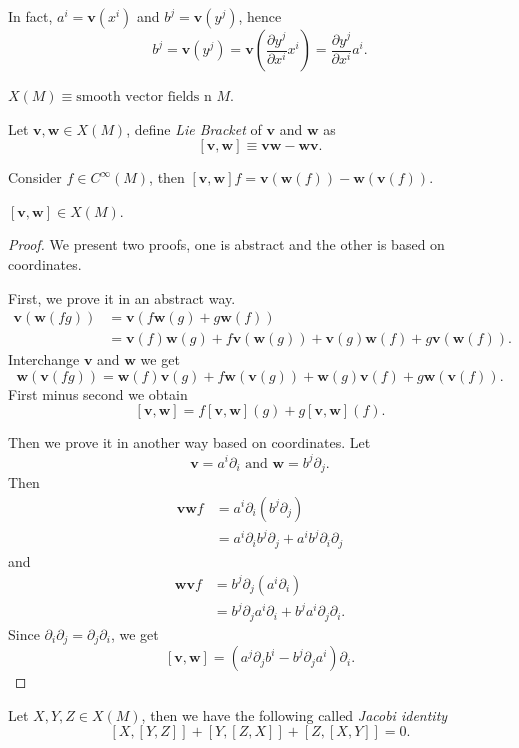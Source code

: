 In fact, $a^i=\mathbf{v}(x^i)$ and $b^j=\mathbf{v}(y^j)$, hence 
\[
  b^j=\mathbf{v}(y^j)=\mathbf{v}\left( \frac{\partial y^j}{\partial x^i} x^i \right)= \frac{\partial y^j}{\partial x^i}a^i. 
\] 

\begin{definition}  
$X(M)\equiv\text{smooth vector fields n }M$.
\end{definition}
\begin{definition}
  Let $\mathbf{v},\mathbf{w}\in X(M)$, define \textit{Lie Bracket} of $\mathbf{v}$ and $\mathbf{w}$ as
  \[
    [\mathbf{v},\mathbf{w}]\equiv \mathbf{v}\mathbf{w}-\mathbf{w}\mathbf{v}.
  \] 
\end{definition}
Consider $f\in C^{\infty}(M)$, then  $[\mathbf{v},\mathbf{w}]f=\mathbf{v}(\mathbf{w}(f))-\mathbf{w}(\mathbf{v}(f))$.
\begin{proposition}
  $[\mathbf{v},\mathbf{w}]\in X(M)$.
\end{proposition}
\begin{proof}
  We present two proofs, one is abstract and the other is based on coordinates.

  First, we prove it in an abstract way. 
  \begin{align*}
    \mathbf{v}\left( \mathbf{w}\left( fg \right)  \right) &= \mathbf{v}\left( f \mathbf{w}(g)+g \mathbf{w}(f) \right) \\
    &= \mathbf{v}(f)\mathbf{w}(g)+f \mathbf{v}\left( \mathbf{w}(g) \right)+\mathbf{v}(g)\mathbf{w}(f)+g \mathbf{v}\left( \mathbf{w}(f) \right) 
  .\end{align*}
  Interchange $\mathbf{v}$ and $\mathbf{w}$ we get
  \[
    \mathbf{w}\left( \mathbf{v}(fg) \right) =\mathbf{w}(f)\mathbf{v}(g)+f\mathbf{w}\left(\mathbf{v}(g)  \right)+ \mathbf{w}(g)\mathbf{v}(f)+g\mathbf{w}\left( \mathbf{v}(f) \right). 
\] 
First minus second we obtain
\[
  [\mathbf{v},\mathbf{w}]=f[\mathbf{v},\mathbf{w}](g)+g[\mathbf{v},\mathbf{w}](f).
\]

Then we prove it in another way based on coordinates. Let 
\[
\mathbf{v}=a^i \partial_i \text{ and } \mathbf{w}=b^j \partial_j.
\]
Then 
\begin{align*}
  \mathbf{v}\mathbf{w}f&=a^i\partial_i\left( b^j \partial_j \right) \\
  &= a^i \partial_i b^j \partial_j +a^ib^j \partial_i\partial_j
\end{align*}
and
\begin{align*}
  \mathbf{w}\mathbf{v}f&=b^j\partial_j\left( a^i\partial_i \right)\\
  &= b^j\partial_j a^i \partial_i+b^ja^i\partial_j\partial_i
.\end{align*}
Since $\partial_i\partial_j=\partial_j\partial_i$, we get
\[
  [\mathbf{v},\mathbf{w}]=(a^j\partial_j b^i-b^j\partial_ja^i)\partial_i.
\] 
\end{proof}
\begin{proposition}
  Let $X,Y,Z\in X(M)$, then we have the following called \textit{Jacobi identity} 
  \[
    [X,[Y,Z]]+[Y,[Z,X]]+[Z,[X,Y]]=0.
  \] 
\end{proposition}


